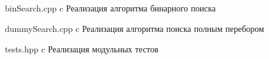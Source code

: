 \begin{appendices} 
	\chapter{}
	\label{a:appendices}
	{binSearch.cpp}
	{c}
	{Реализация алгоритма бинарного поиска}
	
	{dummySearch.cpp}
	{c}
	{Реализация алгоритма поиска полным перебором}
	
	{tests.hpp}
	{c}
	{Реализация модульных тестов}
\end{appendices}

